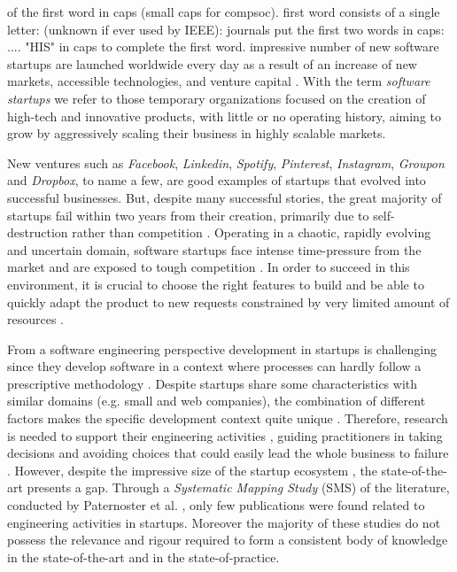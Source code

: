 \documentclass[12pt,journal,compsoc]{../sty/IEEEtran}
\begin{document}
of the first word in caps (small caps for compsoc). %
first word consists of a single letter: %
(unknown if ever used by IEEE): %
journals put the first two words in caps: %
.... %
"HIS" in caps to complete the first word.  impressive number
of new software startups are launched  worldwide every day as a result of an
increase of new markets, accessible  technologies, and venture capital
\cite{8491286}.  With the term  \textit{software startups} we refer to those
temporary organizations focused on  the creation of high-tech and innovative
products, with little or no operating  history, aiming to grow by  aggressively
scaling their business in highly  scalable markets.

New ventures such as \textit{Facebook}, \textit{Linkedin}, \textit{Spotify},
\textit{Pinterest}, \textit{Instagram}, \textit{Groupon} and \textit{Dropbox},
to name a few, are good examples of startups that evolved into successful
businesses. But, despite many successful stories, the great majority of startups
fail within two years from their creation, primarily due to self-destruction
rather than competition \cite{Crowne2002}. Operating in a chaotic, rapidly
evolving and uncertain domain, software startups face intense time-pressure from
the market and are exposed to tough competition \cite{Maccormack2001,
Eisenhardt1998}. In order to succeed in this environment, it is crucial to
choose the right features to build and be able to quickly adapt the product to
new requests constrained by very limited amount of resources \cite{Sutton2000}.

From a software engineering perspective development in startups is challenging
since they develop software in a context where processes can hardly follow a
prescriptive methodology \cite{Sutton2000, Coleman2005}. Despite startups share
some characteristics with similar domains (e.g. small and web companies), the
combination of different factors makes the specific development context quite
unique \cite{Blank2005, Sutton2000}. Therefore, research is needed to support
their engineering activities \cite{Coleman2005}, guiding practitioners in taking
decisions and avoiding choices that could easily lead the whole business to
failure \cite{Kajko-Mattsson2008}. However, despite the impressive size of the
startup ecosystem  \cite{ISI:000243253000007}, the state-of-the-art presents a
gap. Through a  \textit{Systematic Mapping Study} (SMS) of the literature,
conducted by  Paternoster et al. \cite{SMS}, only few publications were found
related to  engineering activities in startups. Moreover the majority of these
studies do  not possess the relevance and rigour required to form a consistent
body of  knowledge in the state-of-the-art and in the state-of-practice.
\end{document}
